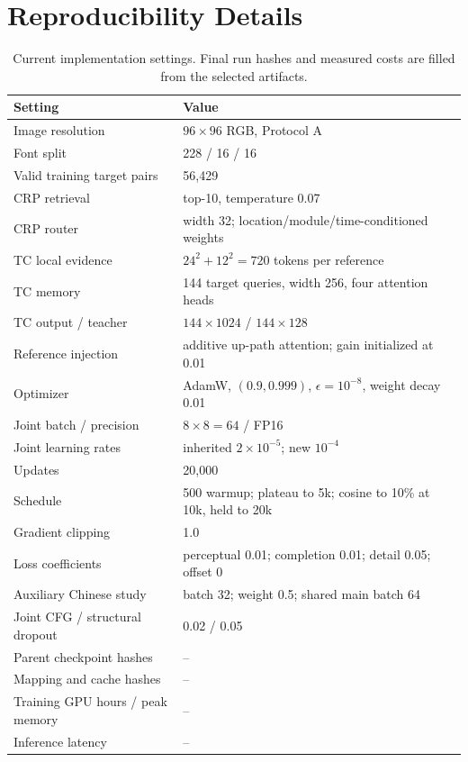 \documentclass{article}
\begin{document}
\section{Reproducibility Details}
\label{app:repro}
\begin{table}[ht]
\centering\small
\caption{Current implementation settings. Final run hashes and measured costs are filled from the selected artifacts.}
\begin{tabular}{ll}
\toprule
Setting & Value\\
\midrule
Image resolution & $96\times96$ RGB, Protocol A\\
Font split & 228 / 16 / 16\\
Valid training target pairs & 56,429\\
CRP retrieval & top-10, temperature 0.07\\
CRP router & width 32; location/module/time-conditioned weights\\
TC local evidence & $24^2+12^2=720$ tokens per reference\\
TC memory & 144 target queries, width 256, four attention heads\\
TC output / teacher & $144\times1024$ / $144\times128$\\
Reference injection & additive up-path attention; gain initialized at 0.01\\
Optimizer & AdamW, $(0.9,0.999)$, $\epsilon=10^{-8}$, weight decay 0.01\\
Joint batch / precision & $8\times8=64$ / FP16\\
Joint learning rates & inherited $2\times10^{-5}$; new $10^{-4}$\\
Updates & 20,000\\
Schedule & 500 warmup; plateau to 5k; cosine to 10\% at 10k, held to 20k\\
Gradient clipping & 1.0\\
Loss coefficients & perceptual 0.01; completion 0.01; detail 0.05; offset 0\\
Auxiliary Chinese study & batch 32; weight 0.5; shared main batch 64\\
Joint CFG / structural dropout & 0.02 / 0.05\\
Parent checkpoint hashes & --\\
Mapping and cache hashes & --\\
Training GPU hours / peak memory & --\\
Inference latency & --\\
\bottomrule
\end{tabular}
\end{table}
\end{document}
